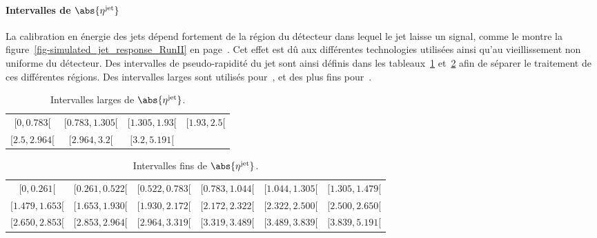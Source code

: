 \paragraph{Intervalles de $\abs{\eta^\text{jet}}$}
La calibration en énergie des jets dépend fortement de la région du détecteur dans lequel le jet laisse un signal, comme le montre la figure~\ref{fig-simulated_jet_response_RunII} en page~\pageref{fig-simulated_jet_response_RunII}.
Cet effet est dû aux différentes technologies utilisées ainsi qu'au vieillissement non uniforme du détecteur.
Des intervalles de pseudo-rapidité du jet sont ainsi définis dans les tableaux~\ref{tab-eta_jet_intervalles_large} et~\ref{tab-eta_jet_intervalles_fin} afin de séparer le traitement de ces différentes régions.
Des intervalles larges sont utilisés pour~, et des plus fins pour~.
\begin{table}[h]
\centering
\begin{tabular}{cccc}
\toprule
$[\num{0}, \num{0.783}[$ & $[\num{0.783}, \num{1.305}[$ & $[\num{1.305}, \num{1.93}[$ & $[\num{1.93}, \num{2.5}[$ \\
$[\num{2.5}, \num{2.964}[$ & $[\num{2.964}, \num{3.2}[$ & $[\num{3.2}, \num{5.191}[$ &  \\
\bottomrule
\end{tabular}
\caption{Intervalles larges de $\abs{\eta^\text{jet}}$.}
\label{tab-eta_jet_intervalles_large}
\end{table}
\begin{table}[h]
\centering
\begin{tabular}{cccccc}
\toprule
$[\num{0}, \num{0.261}[$ & $[\num{0.261}, \num{0.522}[$ & $[\num{0.522}, \num{0.783}[$ & $[\num{0.783}, \num{1.044}[$ & $[\num{1.044}, \num{1.305}[$ & $[\num{1.305}, \num{1.479}[$ \\
$[\num{1.479}, \num{1.653}[$ & $[\num{1.653}, \num{1.930}[$ & $[\num{1.930}, \num{2.172}[$ & $[\num{2.172}, \num{2.322}[$ & $[\num{2.322}, \num{2.500}[$ & $[\num{2.500}, \num{2.650}[$ \\
$[\num{2.650}, \num{2.853}[$ & $[\num{2.853}, \num{2.964}[$ & $[\num{2.964}, \num{3.319}[$ & $[\num{3.319}, \num{3.489}[$ & $[\num{3.489}, \num{3.839}[$ & $[\num{3.839}, \num{5.191}[$ \\
\bottomrule
\end{tabular}
\caption{Intervalles fins de $\abs{\eta^\text{jet}}$.}
\label{tab-eta_jet_intervalles_fin}
\end{table}
